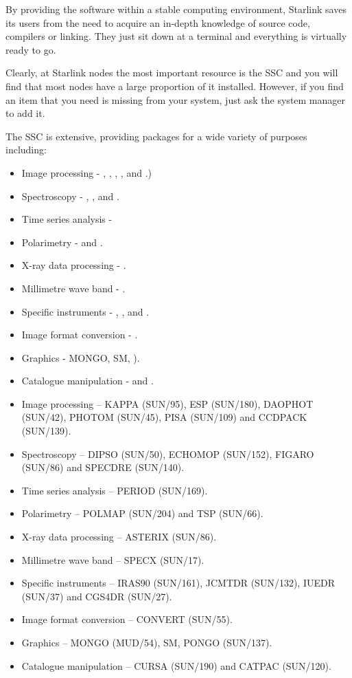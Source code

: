 By providing the software within a stable computing environment,
Starlink saves its users from the need to 
acquire an in-depth knowledge of source code, compilers or linking. They
just sit down at a terminal and everything is virtually ready to go.

Clearly, at Starlink nodes the most important resource is the SSC
and you will find that most nodes have a large proportion of it installed. 
However, if you find an item that you need is missing from your system,
just ask the system manager to add it. 

The SSC is extensive, providing packages for a wide variety of purposes 
including:

\begin{htmlonly}
\begin{itemize}
\item Image processing - {\KAPPAref}, {\ESPref}, {\DAOPHOTref}, {\PHOTOMref}, {\PISAref} and {\CCDPACKref}.) 
\item Spectroscopy - {\DIPSOref}, {\ECHOMOPref}, {\FIGAROref} and 
      {\SPECDREref}.
\item Time series analysis - {\PERIODref}
\item Polarimetry - {\POLMAPref} and {\TSPref}.
\item X-ray data processing - {\ASTERIXref}.
\item Millimetre wave band - {\SPECXref}.
\item Specific instruments - {\IRASref}, {\JCMTDRref}, {\IUEDRref} and {\CGSDRref}.
\item Image format conversion - {\CONVERTref}.
\item Graphics - MONGO, SM, {\PONGOref}). 
\item Catalogue manipulation - {\CATPACref} and {\CURSAref}.
\end{itemize}
\end{htmlonly}
\begin{latex}
\begin{itemize}
\item Image processing -- KAPPA (SUN/95), ESP (SUN/180), DAOPHOT (SUN/42), 
      PHOTOM (SUN/45), PISA (SUN/109) and CCDPACK (SUN/139). 
\item Spectroscopy -- DIPSO (SUN/50), ECHOMOP (SUN/152), FIGARO (SUN/86) and SPECDRE (SUN/140).
\item Time series analysis -- PERIOD (SUN/169).
\item Polarimetry -- POLMAP (SUN/204) and TSP (SUN/66).
\item X-ray data processing -- ASTERIX (SUN/86).
\item Millimetre wave band -- SPECX (SUN/17).
\item Specific instruments -- IRAS90 (SUN/161), JCMTDR (SUN/132), IUEDR (SUN/37) and CGS4DR (SUN/27).
\item Image format conversion -- CONVERT (SUN/55).
\item Graphics -- MONGO (MUD/54), SM, PONGO (SUN/137). 
\item Catalogue manipulation -- CURSA (SUN/190) and CATPAC (SUN/120).
\end{itemize}
\end{latex}

